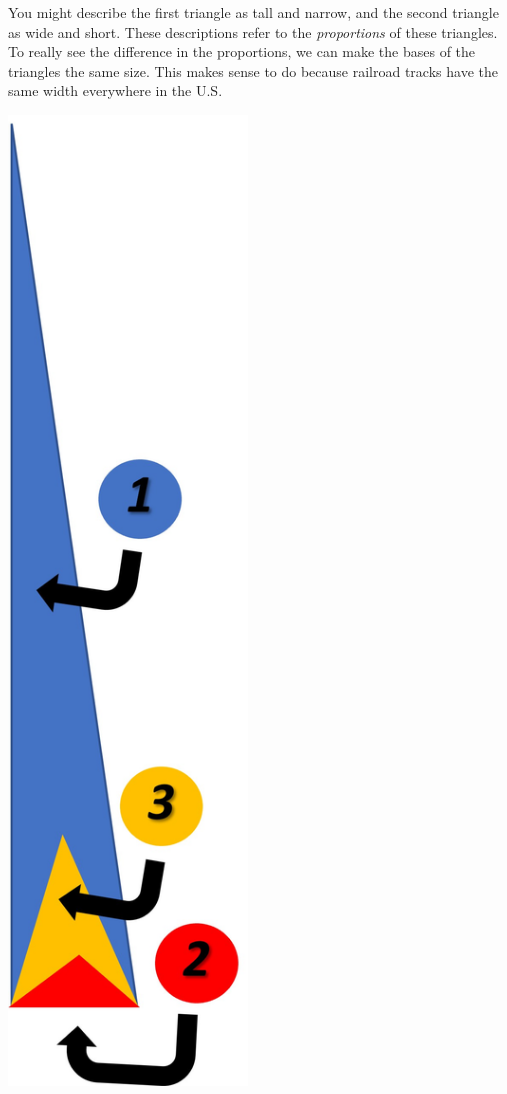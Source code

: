 \documentclass{ximera}
\begin{document}
\begin{exploration}
You might describe the first triangle as tall and narrow, and the second triangle as wide and short.  These descriptions refer to the \emph{proportions} of these triangles.  To really see the difference in the proportions, we can make the bases of the triangles the same size.  This makes sense to do because railroad tracks have the same width everywhere in the U.S.

\begin{image}
         \includegraphics[width=2.5in]{matchedTriangles.jpg}
\end{image}



\end{exploration}
\end{document}
